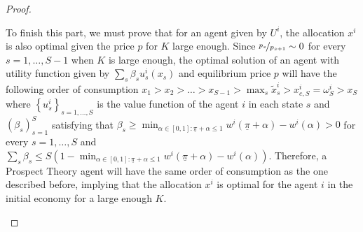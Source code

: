 \documentclass[pdftex]{article}
\numberwithin{equation}{section}
\theoremstyle{th}
\newtheorem{proof lemma}{{Proof Lemma}.}
\theoremstyle{definition}
\begin{document}
{\begin{proof}
\begin{enumerate}
To finish this part, we must prove that for an agent given by
$U^{i}$, the allocation $x^{i}$ is also optimal given the price
$p$ for $K$ large enough. Since $\nicefrac{p_{s}}{p_{s+1}}\sim0$ for every $s=1,\dots,S-1$ when $K$ is large enough,
the optimal solution of an agent with utility function given by $\sum_{s}\beta_{s}u^{i}_s(x_{s})$
and equilibrium price $p$ will have the following order of consumption
$x_{1}>x_{2}>\dots>x_{S-1}>\max_s\tilde{x}^{i}_s>x_{c,S}^{i}=\omega^{i}_S>x_{S}$
where $\left\{u^{i}_s\right\}_{s=1,\dots,S}$ is the value function of the agent $i$ in each state $s$ and $\left(\beta_{s}\right)_{s=1}^{S}$
satisfying that $\beta_{s}\geq\min_{\alpha\in[0,1]:\underline{\pi}+\alpha\leq1}w^{i}\left(\underline{\pi}+\alpha\right)-w^{i}\left(\alpha\right)>0$
for every $s=1,\dots,S$ and $\sum_{s}\beta_{s}\leq S\left(1-\min_{\alpha\in[0,1]:\underline{\pi}+\alpha\leq1}w^{i}\left(\underline{\pi}+\alpha\right)-w^{i}\left(\alpha\right)\right)$.
Therefore, a Prospect Theory agent will have the same order of consumption
as the one described before, implying that the allocation $x^{i}$
is optimal for the agent $i$ in the initial economy for a large enough $K$.
\end{enumerate}



\end{proof}}
\end{document}
